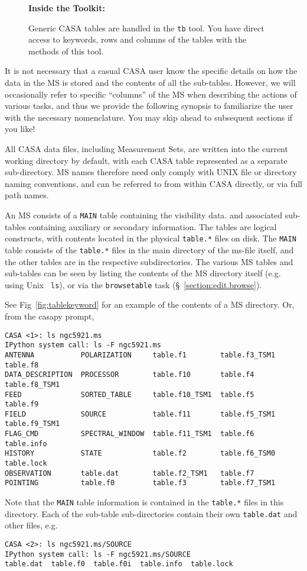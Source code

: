 \begin{wrapfigure}{r}{2.5in}
  \begin{boxedminipage}{2.5in}
     \centerline{\bf Inside the Toolkit:}
     Generic CASA tables are handled in the {\tt tb} tool.
     You have direct access to keywords, rows and columns of
     the tables with the methods of this tool.
  \end{boxedminipage}
\end{wrapfigure}

It is not necessary that a casual CASA user know the specific details
on how the data in the MS is stored and the contents of all the
sub-tables.  However, we will occasionally refer to specific
``columns'' of the MS when describing the actions of various tasks,
and thus we provide the following synopsis to familiarize the user
with the necessary nomenclature.  You may skip ahead to subsequent
sections if you like!

All CASA data files, including Measurement Sets, are written into
the current working directory by default, with each CASA table
represented as a separate sub-directory.  MS names therefore need only
comply with UNIX file or directory naming conventions, and can be
referred to from within CASA directly, or via full path names.

An MS consists of a {\tt MAIN} table containing the visibility data. 
and associated sub-tables containing auxiliary or secondary
information.  The tables are logical constructs, with
contents located in the physical {\tt table.*} files on disk.  The
{\tt MAIN} table consists of the {\tt table.*} files in the main
directory of the ms-file itself, and the other tables are in the 
respective subdirectories.  The various MS tables and sub-tables can be seen by
listing the contents of the MS directory itself (e.g. using Unix {\tt
ls}), or via the {\tt browsetable} task (\S~\ref{section:edit.browse}).

See Fig~\ref{fig:tablekeyword} for an example of the contents of a MS
directory.  Or, from the casapy prompt,
\small
\begin{verbatim}
CASA <1>: ls ngc5921.ms
IPython system call: ls -F ngc5921.ms
ANTENNA           POLARIZATION     table.f1        table.f3_TSM1  table.f8
DATA_DESCRIPTION  PROCESSOR        table.f10       table.f4       table.f8_TSM1
FEED              SORTED_TABLE     table.f10_TSM1  table.f5       table.f9
FIELD             SOURCE           table.f11       table.f5_TSM1  table.f9_TSM1
FLAG_CMD          SPECTRAL_WINDOW  table.f11_TSM1  table.f6       table.info
HISTORY           STATE            table.f2        table.f6_TSM0  table.lock
OBSERVATION       table.dat        table.f2_TSM1   table.f7
POINTING          table.f0         table.f3        table.f7_TSM1
\end{verbatim}
\normalsize
Note that the {\tt MAIN} table information is contained in the
{\tt table.*} files in this directory.  Each of the sub-table
sub-directories contain their own {\tt table.dat} and other files, e.g.
\small
\begin{verbatim}
CASA <2>: ls ngc5921.ms/SOURCE
IPython system call: ls -F ngc5921.ms/SOURCE
table.dat  table.f0  table.f0i  table.info  table.lock
\end{verbatim}
\normalsize

